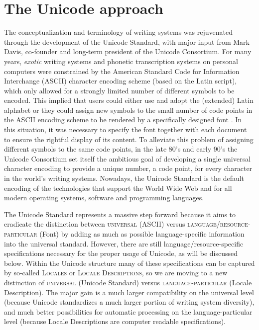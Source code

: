 \section{The Unicode approach}
\label{the-unicode-approach}

The conceptualization and terminology of writing systems was rejuvenated through the development of the Unicode Standard, with major input from Mark Davis, co-founder and long-term president of the Unicode Consortium. For many years, \textit{exotic} writing systems and phonetic transcription systems on personal computers were constrained by the American Standard Code for Information Interchange (ASCII) character encoding scheme (based on the Latin script), which only allowed for a strongly limited number of different symbols to be encoded. This implied that users could either use and adopt the (extended) Latin alphabet or they could assign new symbols to the small number of code points in the ASCII encoding scheme to be rendered by a specifically designed font \citep{BirdSimons2003}. In this situation, it was necessary to specify the font together with each document to ensure the rightful display of its content. To alleviate this problem of assigning different symbols to the same code points, in the late 80's and early 90's the Unicode Consortium set itself the ambitious goal of developing a single universal character encoding to provide a unique number, a code point, for every character in the world's writing systems. Nowadays, the Unicode Standard is the default encoding of the technologies that support the World Wide Web and for all modern operating systems, software and programming languages.

The Unicode Standard represents a massive step forward because it aims to eradicate the distinction between \textsc{universal} (ASCII) versus \textsc{language/resource-particular} (Font) by adding as much as possible language-specific information into the universal standard. However, there are still language/resource-specific specifications necessary for the proper usage of Unicode, as will be discussed below. Within the Unicode structure many of these specifications can be captured by so-called \textsc{Locales} or \textsc{Locale Descriptions}, so we are moving to a new distinction of \textsc{universal} (Unicode Standard) versus \textsc{language-particular} (Locale Description). The major gain is a much larger compatibility on the universal level (because Unicode standardizes a much larger portion of writing system diversity), and much better possibilities for automatic processing on the language-particular level (because Locale Descriptions are computer readable specifications).

